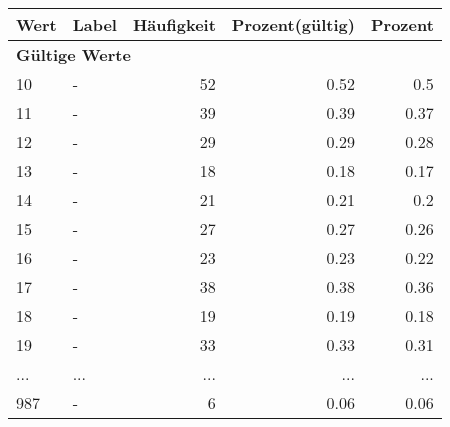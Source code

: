      \begin{longtable}{lXrrr}
     \toprule
     \textbf{Wert} & \textbf{Label} & \textbf{Häufigkeit} & \textbf{Prozent(gültig)} & \textbf{Prozent} \\
     \endhead
     \midrule
     \multicolumn{5}{l}{\textbf{Gültige Werte}}\\
        10 & \multicolumn{1}{X}{-} & %
          \num{52} &
          \num[round-mode=places,round-precision=2]{0.52} &
          \num[round-mode=places,round-precision=2]{0.5} \\
        11 & \multicolumn{1}{X}{-} & %
          \num{39} &
          \num[round-mode=places,round-precision=2]{0.39} &
          \num[round-mode=places,round-precision=2]{0.37} \\
        12 & \multicolumn{1}{X}{-} & %
          \num{29} &
          \num[round-mode=places,round-precision=2]{0.29} &
          \num[round-mode=places,round-precision=2]{0.28} \\
        13 & \multicolumn{1}{X}{-} & %
          \num{18} &
          \num[round-mode=places,round-precision=2]{0.18} &
          \num[round-mode=places,round-precision=2]{0.17} \\
        14 & \multicolumn{1}{X}{-} & %
          \num{21} &
          \num[round-mode=places,round-precision=2]{0.21} &
          \num[round-mode=places,round-precision=2]{0.2} \\
        15 & \multicolumn{1}{X}{-} & %
          \num{27} &
          \num[round-mode=places,round-precision=2]{0.27} &
          \num[round-mode=places,round-precision=2]{0.26} \\
        16 & \multicolumn{1}{X}{-} & %
          \num{23} &
          \num[round-mode=places,round-precision=2]{0.23} &
          \num[round-mode=places,round-precision=2]{0.22} \\
        17 & \multicolumn{1}{X}{-} & %
          \num{38} &
          \num[round-mode=places,round-precision=2]{0.38} &
          \num[round-mode=places,round-precision=2]{0.36} \\
        18 & \multicolumn{1}{X}{-} & %
          \num{19} &
          \num[round-mode=places,round-precision=2]{0.19} &
          \num[round-mode=places,round-precision=2]{0.18} \\
        19 & \multicolumn{1}{X}{-} & %
          \num{33} &
          \num[round-mode=places,round-precision=2]{0.33} &
          \num[round-mode=places,round-precision=2]{0.31} \\
       ... & ... & ... & ... & ... \\
        987 & \multicolumn{1}{X}{-} & %
          \num{6} &
          \num[round-mode=places,round-precision=2]{0.06} &
          \num[round-mode=places,round-precision=2]{0.06} \\


\end{longtable}
